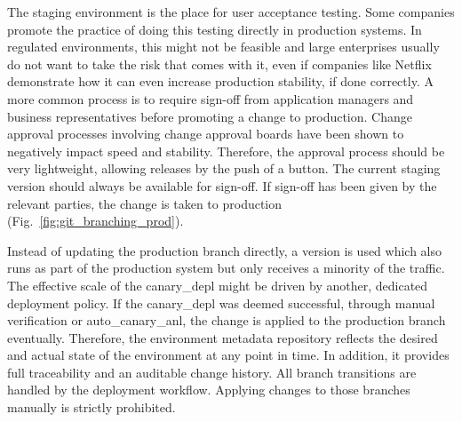\documentclass[../main.tex]{subfiles}
\begin{document}
    The staging environment is the place for user acceptance testing.
    Some companies promote the practice of doing this testing directly in production systems.
    In regulated environments, this might not be feasible and large enterprises usually do not want to take the risk that comes with it, even if companies like Netflix demonstrate how it can even increase production stability, if done correctly.
    A more common process is to require sign-off from application managers and business representatives before promoting a change to production.
    Change approval processes involving change approval boards have been shown to negatively impact speed and stability\cite{state_of_devops_19}.
    Therefore, the approval process should be very lightweight, allowing releases by the push of a button.
    The current staging version should always be available for sign-off.
    If sign-off has been given by the relevant parties, the change is taken to production (Fig.~\ref{fig:git_branching_prod}).

    

    Instead of updating the production branch directly, a  version is used which also runs as part of the production system but only receives a minority of the traffic.
    The effective scale of the \gls{canary_depl} might be driven by another, dedicated deployment policy.
    If the \gls{canary_depl} was deemed successful, through manual verification or \gls{auto_canary_anl}, the change is applied to the production branch eventually.
    Therefore, the environment metadata repository reflects the desired and actual state of the environment at any point in time.
    In addition, it provides full traceability and an auditable change history.
    All branch transitions are handled by the deployment workflow.
    Applying changes to those branches manually is strictly prohibited.
\end{document}
